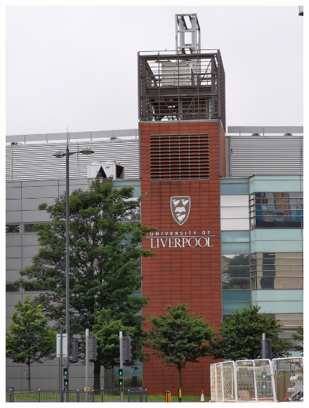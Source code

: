 \documentclass[11pt]{article}
\begin{document}
\begin{figure}[H]
    \centering
    \includegraphics[width=\textwidth]{1D.jpg}
\end{figure}
\end{document}
